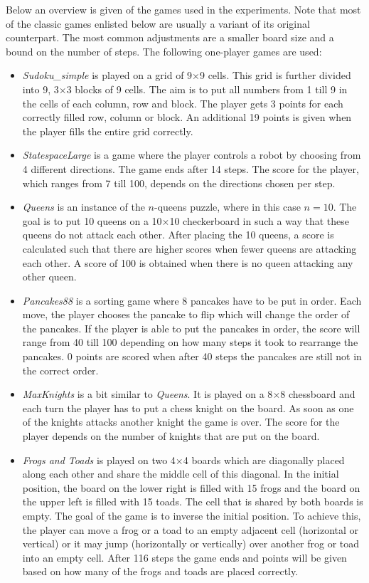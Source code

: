 \documentclass[journal]{IEEEtran}
\begin{document}
\appendix
\label{appendix:games}
Below an overview is given of the games used in the experiments. Note that most of the classic games enlisted below are usually a variant of its original counterpart. The most common adjustments are a smaller board size and a bound on the number of steps.
The following one-player games are used:
\begin{itemize}
\item \textit{Sudoku\_simple} is played on a grid of 9$\times$9 cells. This grid is further divided into 9, 3$\times$3 blocks of 9 cells. The aim is to put all numbers from 1 till 9 in the cells of each column, row and block. The player gets 3 points for each correctly filled row, column or block. An additional 19 points is given when the player fills the entire grid correctly.
\item \textit{StatespaceLarge} is a game where the player controls a robot by choosing from 4 different directions. The game ends after 14 steps. The score for the player, which ranges from 7 till 100, depends on the directions chosen per step. 
\item \textit{Queens} is an instance of the $n$-queens puzzle, where in this case $n=10$. The goal is to put 10 queens on a 10$\times$10 checkerboard in such a way that these queens do not attack each other. After placing the 10 queens, a score is calculated such that there are higher scores when fewer queens are attacking each other. A score of 100 is obtained when there is no queen attacking any other queen.
\item \textit{Pancakes88} is a sorting game where 8 pancakes have to be put in order. Each move, the player chooses the pancake to flip which will change the order of the pancakes. If the player is able to put the pancakes in order, the score will range from 40 till 100 depending on how many steps it took to rearrange the pancakes. 0 points are scored when after 40 steps the pancakes are still not in the correct order.
\item \textit{MaxKnights} is a bit similar to \textit{Queens}. It is played on a 8$\times$8 chessboard and each turn the player has to put a chess knight on the board. As soon as one of the knights attacks another knight the game is over. The score for the player depends on the number of knights that are put on the board.
\item \textit{Frogs and Toads} is played on two 4$\times$4 boards which are diagonally placed along each other and share the middle cell of this diagonal. In the initial position, the board on the lower right is filled with 15 frogs and the board on the upper left is filled with 15 toads. The cell that is shared by both boards is empty. The goal of the game is to inverse the initial position. To achieve this, the player can move a frog or a toad to an empty adjacent cell (horizontal or vertical) or it may jump (horizontally or vertically) over another frog or toad into an empty cell. After 116 steps the game ends and points will be given based on how many of the frogs and toads are placed correctly.
\end{itemize}
\end{document}
